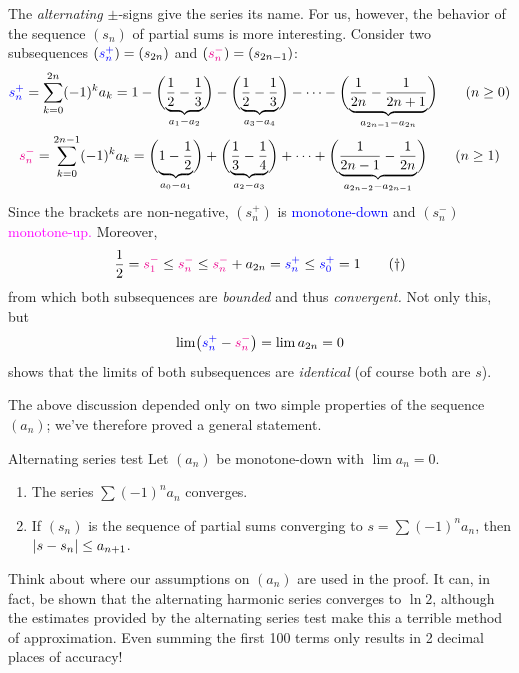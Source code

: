 The \emph{alternating} $\pm$-signs give the series its name. For us, however, the behavior of the sequence $(s_n)$ of partial sums is more interesting. Consider two subsequences $(\textcolor{blue}{s_n^+})=(s_{2n})$ and $(\textcolor{magenta}{s_n^-})=(s_{2n-1})$:
\begin{gather*}
	\textcolor{blue}{s_n^+}=\sum_{k=0}^{2n}(-1)^ka_k 
		 =1 -\biggl(\underbrace{\frac 12-\frac 13}_{a_1-a_2}\biggr) -\biggl(\underbrace{\frac 12-\frac 13}_{a_3-a_4}\biggr)-\cdots -\biggl(\underbrace{\frac 1{2n}-\frac 1{2n+1}}_{a_{2n-1}-a_{2n}}\biggr) \tag{$n\ge 0$}\\
	\textcolor{magenta}{s_n^-}=\sum_{k=0}^{2n-1}(-1)^ka_k =\biggl(\underbrace{1-\frac 12}_{a_0-a_1}\biggr) +\biggl(\underbrace{\frac 13-\frac 14}_{a_2-a_3}\biggr) +\cdots +\biggl(\underbrace{\frac 1{2n-1}-\frac 1{2n}}_{a_{2n-2}-a_{2n-1}}\biggr) \tag{$n\ge 1$}
\end{gather*}
Since the brackets are non-negative, $(s_n^+)$ is \textcolor{blue}{monotone-down} and $(s_n^-)$ \textcolor{magenta}{monotone-up.} Moreover,
\[\frac 12=\textcolor{magenta}{s_1^-}\le \textcolor{magenta}{s_n^-}\le \textcolor{magenta}{s_n^-}+a_{2n} = \textcolor{blue}{s_n^+} \le \textcolor{blue}{s_0^+} =1 \tag{$\dag$}\]
from which both subsequences are \emph{bounded} and thus \emph{convergent.} Not only this, but
\[\lim\bigl(\textcolor{blue}{s_n^+} -\textcolor{magenta}{s_n^-}\bigr) =\lim a_{2n} =0\]
shows that the limits of both subsequences are \emph{identical} (of course both are $s$).\goodbreak

The above discussion depended only on two simple properties of the sequence $(a_n)$; we've therefore proved a general statement.

\begin{thm}{Alternating series test}{}
	Let $(a_n)$ be monotone-down with $\lim a_n=0$.
	\begin{enumerate}
	  \item The series $\sum (-1)^na_n$ converges.
		\item If $(s_n)$ is the sequence of partial sums converging to $s=\sum (-1)^na_n$, then $\left| s-s_n\right|\le a_{n+1}$.
	\end{enumerate} 
\end{thm}

Think about where our assumptions on $(a_n)$ are used in the proof. It can, in fact, be shown that the alternating harmonic series converges to $\ln 2$, although the estimates provided by the alternating series test make this a terrible method of approximation. Even summing the first 100 terms only results in 2 decimal places of accuracy!

